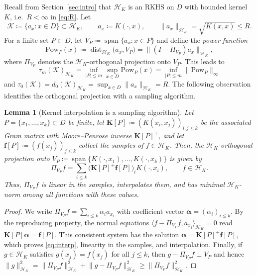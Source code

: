 \documentclass[11pt,reqno, a4paper]{article}
\numberwithin{equation}{section}
\DeclareMathOperator{\dist}{dist}
\newtheorem{lemma}[theorem]{Lemma}
\newcommand{\ip}[2]{\langle #1,#2\rangle}
\newcommand{\norm}[1]{\lVert #1\rVert}
\DeclareMathOperator{\spann}{span}
\begin{document}
Recall from Section~\ref{sec:intro} that $\mathcal H_K$ is an RKHS on $D$ with bounded kernel $K$, i.e.\ $R<\infty$ in \eqref{eq:R}.
Let
\begin{equation}
    \mathcal{K} \coloneqq \{a_x : x\in D\}\subset \mathcal H_K, \qquad a_x\coloneqq K(\cdot,x), \qquad \norm{a_x}_{\mathcal H_K}=\sqrt{K(x,x)}\le R.
\end{equation}
For a finite set $P\subset D$, let $V_P\coloneqq\spann\{a_x : x\in P\}$ and define the \emph{power function}
\begin{equation}
    \mathrm{Pow}_P(x) \coloneqq \dist_{\mathcal H_K}\bigl(a_x, V_P\bigr) = \|(I-\Pi_{V_P})a_x\|_{\mathcal H_K},
\end{equation}
where $\Pi_{V_P}$ denotes the $\mathcal H_K$-orthogonal projection onto $V_P$.
This leads to
\begin{equation}\label{power_f}
    \tau_m(\mathcal{K})_{\mathcal{H}_K} = \inf_{|P|\le m} \sup_{x\in D} \mathrm{Pow}_P(x) = \inf_{|P|\le m} \|\mathrm{Pow}_P\|_\infty
\end{equation}
and $\tau_0(\mathcal{K})=d_0(\mathcal{K})_{\mathcal H_K}=\sup_{x\in D}\norm{a_x}_{\mathcal H_K}=R$.
The following observation identifies the orthogonal projection with a sampling algorithm.

\begin{lemma}[Kernel interpolation is a sampling algorithm]\label{lem:interp}
Let $P=\{x_1,\dots,x_k\}\subset D$ be finite, let $\mathbf K[P]\coloneqq(K(x_i,x_j))_{i,j\le k}$ be the associated Gram matrix with Moore--Penrose inverse $\mathbf K[P]^{+}$, and let $\mathbf f[P]\coloneqq(f(x_j))_{j\le k}$ collect the samples of $f\in\mathcal H_K$.
Then, the $\mathcal H_K$-orthogonal projection onto $V_P \coloneqq \spann\{K(\cdot,x_1),\ldots, K(\cdot,x_k)\}$ is given by
\begin{equation}\label{eq:interp}
    \Pi_{V_P}f=\sum_{i\le k}\bigl(\mathbf K[P]^{+}\mathbf f[P]\bigr)_i K(\cdot,x_i), \qquad f\in\mathcal H_K .
\end{equation}
Thus, $\Pi_{V_P}f$ is linear in the samples, interpolates them, and has minimal $\mathcal H_K$-norm among all functions with these values.
\end{lemma}

\begin{proof}
We write $\Pi_{V_P}f=\sum_{i\le k}\alpha_i a_{x_i}$ with coefficient vector $\boldsymbol{\alpha}=(\alpha_i)_{i\le k}$.
By the reproducing property, the normal equations $\ip{f-\Pi_{V_P}f}{a_{x_j}}_{\mathcal H_K}=0$ read $\mathbf K[P]\boldsymbol{\alpha}=\mathbf f[P]$.
This consistent system has the solution $\boldsymbol{\alpha}=\mathbf K[P]^{+}\mathbf f[P]$, which proves \eqref{eq:interp}, linearity in the samples, and interpolation.
Finally, if $g\in\mathcal H_K$ satisfies $g(x_j)=f(x_j)$ for all $j\le k$, then $g-\Pi_{V_P}f\perp V_P$ and hence $\norm{g}_{\mathcal H_K}^2=\norm{\Pi_{V_P}f}_{\mathcal H_K}^2+\norm{g-\Pi_{V_P}f}_{\mathcal H_K}^2\ge\norm{\Pi_{V_P}f}_{\mathcal H_K}^2$.
\end{proof}
 
\end{document}
